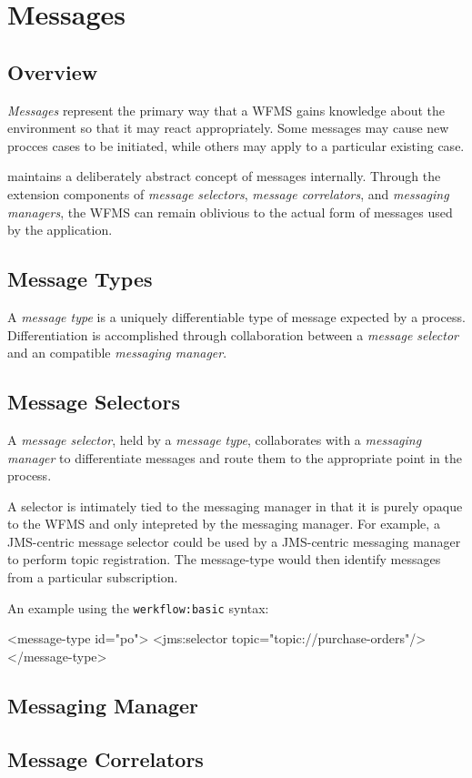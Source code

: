 \chapter{Messages}

\section{Overview}

\emph{Messages} represent the primary way that a
WFMS gains knowledge about the environment so that it
may react appropriately.  Some messages may cause new
procces cases to be initiated, while others may apply
to a particular existing case.  

{\werkflow} maintains a deliberately abstract concept
of messages internally.  Through the extension components
of \emph{message selectors}, \emph{message correlators},
and \emph{messaging managers}, the WFMS can remain
oblivious to the actual form of messages used by the application.

\section{Message Types}

A \emph{message type} is a uniquely differentiable type
of message expected by a process.  Differentiation is accomplished
through collaboration between a \emph{message selector} and
an compatible \emph{messaging manager}.  

\section{Message Selectors}

A \emph{message selector}, held by a \emph{message type}, 
collaborates with a \emph{messaging manager} to differentiate
messages and route them to the appropriate point in the process.

A selector is intimately tied to the messaging manager in that it
is purely opaque to the WFMS and only intepreted by the messaging
manager.  For example, a JMS-centric message selector could be
used by a JMS-centric messaging manager to perform topic registration.
The message-type would then identify messages from a particular
subscription.

An example using the \verb|werkflow:basic| syntax:

\begin{codelisting}
<message-type id="po">
    <jms:selector topic="topic://purchase-orders"/>
</message-type>
\end{codelisting}


\section{Messaging Manager}

\section{Message Correlators}

